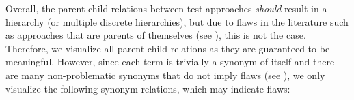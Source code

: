     
    \ExampleParChdGraphs{}

    \clearpage\else
    \flawMnfstsTable{}
    \flawDmnsTable{}
\fi
{}\label{relevantSyns}
Overall, the parent-child relations between test approaches \emph{should}
result in a hierarchy (or multiple discrete hierarchies), but due to flaws in
the literature such as approaches that are parents of themselves
(see ), this is not the case. Therefore, we visualize all
parent-child relations as they are guaranteed to be meaningful.
However, since each term is trivially a synonym of itself and there are many
non-problematic synonyms that do not imply flaws (see ),
we only visualize the following synonym relations, which may indicate flaws:

